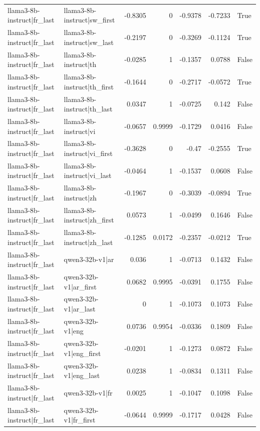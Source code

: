\begin{table}
\begin{tabular}{l l r r r r l}
llama3-8b-instruct|fr_last & llama3-8b-instruct|sw_first & -0.8305 & 0 & -0.9378 & -0.7233 & True \\
llama3-8b-instruct|fr_last & llama3-8b-instruct|sw_last & -0.2197 & 0 & -0.3269 & -0.1124 & True \\
llama3-8b-instruct|fr_last & llama3-8b-instruct|th & -0.0285 & 1 & -0.1357 & 0.0788 & False \\
llama3-8b-instruct|fr_last & llama3-8b-instruct|th_first & -0.1644 & 0 & -0.2717 & -0.0572 & True \\
llama3-8b-instruct|fr_last & llama3-8b-instruct|th_last & 0.0347 & 1 & -0.0725 & 0.142 & False \\
llama3-8b-instruct|fr_last & llama3-8b-instruct|vi & -0.0657 & 0.9999 & -0.1729 & 0.0416 & False \\
llama3-8b-instruct|fr_last & llama3-8b-instruct|vi_first & -0.3628 & 0 & -0.47 & -0.2555 & True \\
llama3-8b-instruct|fr_last & llama3-8b-instruct|vi_last & -0.0464 & 1 & -0.1537 & 0.0608 & False \\
llama3-8b-instruct|fr_last & llama3-8b-instruct|zh & -0.1967 & 0 & -0.3039 & -0.0894 & True \\
llama3-8b-instruct|fr_last & llama3-8b-instruct|zh_first & 0.0573 & 1 & -0.0499 & 0.1646 & False \\
llama3-8b-instruct|fr_last & llama3-8b-instruct|zh_last & -0.1285 & 0.0172 & -0.2357 & -0.0212 & True \\
llama3-8b-instruct|fr_last & qwen3-32b-v1|ar & 0.036 & 1 & -0.0713 & 0.1432 & False \\
llama3-8b-instruct|fr_last & qwen3-32b-v1|ar_first & 0.0682 & 0.9995 & -0.0391 & 0.1755 & False \\
llama3-8b-instruct|fr_last & qwen3-32b-v1|ar_last & 0 & 1 & -0.1073 & 0.1073 & False \\
llama3-8b-instruct|fr_last & qwen3-32b-v1|eng & 0.0736 & 0.9954 & -0.0336 & 0.1809 & False \\
llama3-8b-instruct|fr_last & qwen3-32b-v1|eng_first & -0.0201 & 1 & -0.1273 & 0.0872 & False \\
llama3-8b-instruct|fr_last & qwen3-32b-v1|eng_last & 0.0238 & 1 & -0.0834 & 0.1311 & False \\
llama3-8b-instruct|fr_last & qwen3-32b-v1|fr & 0.0025 & 1 & -0.1047 & 0.1098 & False \\
llama3-8b-instruct|fr_last & qwen3-32b-v1|fr_first & -0.0644 & 0.9999 & -0.1717 & 0.0428 & False \\

\end{tabular}
\end{table}
